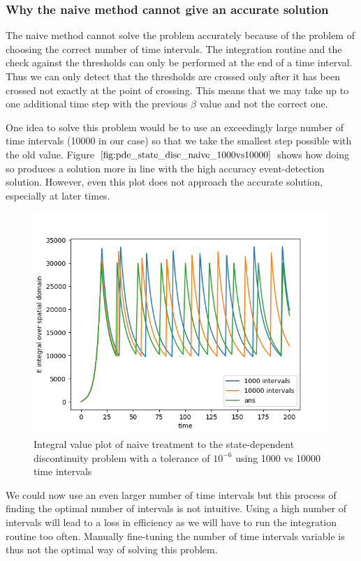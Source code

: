 \documentclass{article}
\begin{document}
\subsubsection{Why the naive method cannot give an accurate solution}
\label{subsubsection:pde_state_naive_always_inaccurate}
The naive method cannot solve the problem accurately because of the problem of choosing the correct number of time intervals. The integration routine and the check against the thresholds can only be performed at the end of a time interval. Thus we can only detect that the thresholds are crossed only after it has been crossed not exactly at the point of crossing. This means that we may take up to one additional time step with the previous $\beta$ value and not the correct one.

One idea to solve this problem would be to use an exceedingly large number of time intervals (10000 in our case) so that we take the smallest step possible with the old value. Figure $\ref{fig:pde_state_disc_naive_1000vs10000}$ shows how doing so produces a solution more in line with the high accuracy event-detection solution. However, even this plot does not approach the accurate solution, especially at later times. 

\begin{figure}[H]
\centering
\includegraphics[width=0.7\linewidth]{./figures/pde_state_disc_naive_1000vs10000}
\caption{Integral value plot of naive treatment to the state-dependent discontinuity problem with a tolerance of $10^{-6}$ using 1000 vs 10000 time intervals}
\label{fig:pde_state_disc_naive_1000vs10000}
\end{figure}

We could now use an even larger number of time intervals but this process of finding the optimal number of intervals is not intuitive. Using a high number of intervals will lead to a loss in efficiency as we will have to run the integration routine too often. Manually fine-tuning the number of time intervals variable is thus not the optimal way of solving this problem. 
\end{document}
